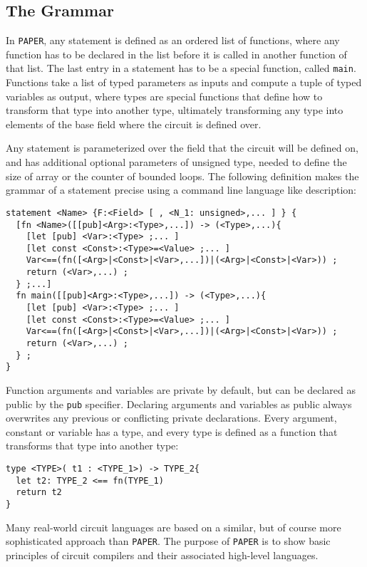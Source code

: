 \subsection{The Grammar}
In \texttt{PAPER}, any statement is defined as an ordered list of functions, where any function has to be declared in the list before it is called in another function of that list. The last entry in a statement has to be a special function, called \texttt{main}. Functions take a list of typed parameters as inputs and compute a tuple of typed variables as output, where types are special functions that define how to transform that type into another type, ultimately transforming any type into elements of the base field where the circuit is defined over. 

Any statement is parameterized over the field that the circuit will be defined on, and has additional optional parameters of unsigned type, needed to define the size of array or the counter of bounded loops. The following definition makes the grammar of a statement precise using a command line language like description: 
\begin{lstlisting}
statement <Name> {F:<Field> [ , <N_1: unsigned>,... ] } {
  [fn <Name>([[pub]<Arg>:<Type>,...]) -> (<Type>,...){
    [let [pub] <Var>:<Type> ;... ]
    [let const <Const>:<Type>=<Value> ;... ]
    Var<==(fn([<Arg>|<Const>|<Var>,...])|(<Arg>|<Const>|<Var>)) ;
    return (<Var>,...) ;
  } ;...]
  fn main([[pub]<Arg>:<Type>,...]) -> (<Type>,...){
    [let [pub] <Var>:<Type> ;... ]
    [let const <Const>:<Type>=<Value> ;... ]
    Var<==(fn([<Arg>|<Const>|<Var>,...])|(<Arg>|<Const>|<Var>)) ;
    return (<Var>,...) ;
  } ;
}
\end{lstlisting}
Function arguments and variables are private by default, but can be declared as public by the \texttt{pub} specifier. Declaring arguments and variables as public always overwrites any previous or conflicting private declarations. Every argument, constant or variable has a type, and every type is defined as a function that transforms that type into another type: 
\begin{lstlisting}
type <TYPE>( t1 : <TYPE_1>) -> TYPE_2{
  let t2: TYPE_2 <== fn(TYPE_1)
  return t2
}
\end{lstlisting}
Many real-world circuit languages are based on a similar, but of course more sophisticated approach than \texttt{PAPER}. The purpose of \texttt{PAPER} is to show basic principles of circuit compilers and their associated high-level languages.

